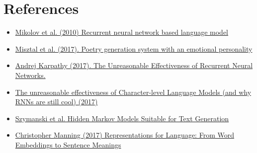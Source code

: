 \documentclass[15pt]{article}
\begin{document}
\section{References}
\begin{itemize}
\item \href{http://www.fit.vutbr.cz/research/groups/speech/publi/2010/mikolov_interspeech2010_IS100722.pdf}{Mikolov et al. (2010) Recurrent neural network based language model}
\item  \href{https://pdfs.semanticscholar.org/d89d/053b1c2481088b1af2bd36e0a6d959ff1373.pdf} {Misztal et al. (2017). Poetry generation system with an emotional personality}
\item \href{http://karpathy.github.io/2015/05/21/rnn-effectiveness/}{Andrej Karpathy (2017). The Unreasonable Effectiveness of Recurrent Neural Networks.}

\item \href{http://nbviewer.jupyter.org/gist/yoavg/d76121dfde2618422139}{The unreasonable effectiveness of Character-level Language Models (and why RNNs are still cool) (2017)}

\item \href{https://pdfs.semanticscholar.org/cb06/a81281a394a3eddd9e2cb8f409490c858782.pdf} {Szymanski et al. Hidden Markov Models Suitable for Text Generation}
\item \href{https://nlp.stanford.edu/~manning/talks/Simons-Institute-Manning-2017.pdf}{Christopher Manning (2017) Representations for Language: From Word Embeddings to Sentence Meanings}
\end{itemize}
\end{document}
